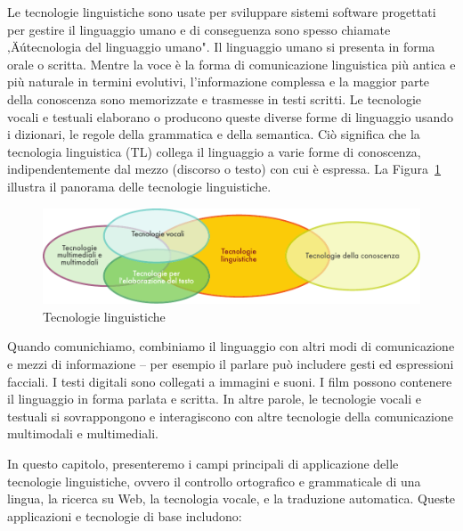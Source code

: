 \begin{multicols}{2}

Le tecnologie linguistiche sono usate per sviluppare sistemi software
progettati per gestire il linguaggio umano e di conseguenza sono spesso
chiamate ‚Äútecnologia del linguaggio umano". Il linguaggio umano si presenta in
forma orale o scritta. Mentre la voce \`{e} la forma di comunicazione
linguistica pi\`{u} antica e pi\`{u} naturale in termini evolutivi,
l'informazione complessa e la maggior parte della conoscenza sono memorizzate
e trasmesse in testi scritti. Le tecnologie vocali e testuali elaborano o
producono queste diverse forme di linguaggio usando i dizionari, le regole
della grammatica e della semantica. Ci\`{o} significa che la tecnologia
linguistica (TL) collega il linguaggio a varie forme di conoscenza,
indipendentemente dal mezzo (discorso o testo) con cui \`{e} espressa. La
Figura~\ref{fig:ltincontext_de} illustra il panorama delle tecnologie
linguistiche. 


\begin{figure}[htb]
  \center
  \includegraphics[width=\textwidth]{../_media/italian/language_technologies}
  \caption{Tecnologie linguistiche}
  \label{fig:ltincontext_de}
\end{figure}

Quando comunichiamo, combiniamo il linguaggio con altri modi di comunicazione
e mezzi di informazione -- per esempio il parlare pu\`{o} includere gesti ed
espressioni facciali. I testi digitali sono collegati a immagini e suoni. I
film possono contenere il linguaggio in forma parlata e scritta. In altre
parole, le tecnologie vocali e testuali si sovrappongono e interagiscono con
altre tecnologie della comunicazione multimodali e multimediali.

In questo capitolo, presenteremo i campi principali di applicazione delle
tecnologie linguistiche, ovvero il controllo ortografico e grammaticale di una
lingua, la ricerca su Web, la tecnologia vocale, e la traduzione automatica.
Queste applicazioni e tecnologie di base includono:


\end{multicols}
